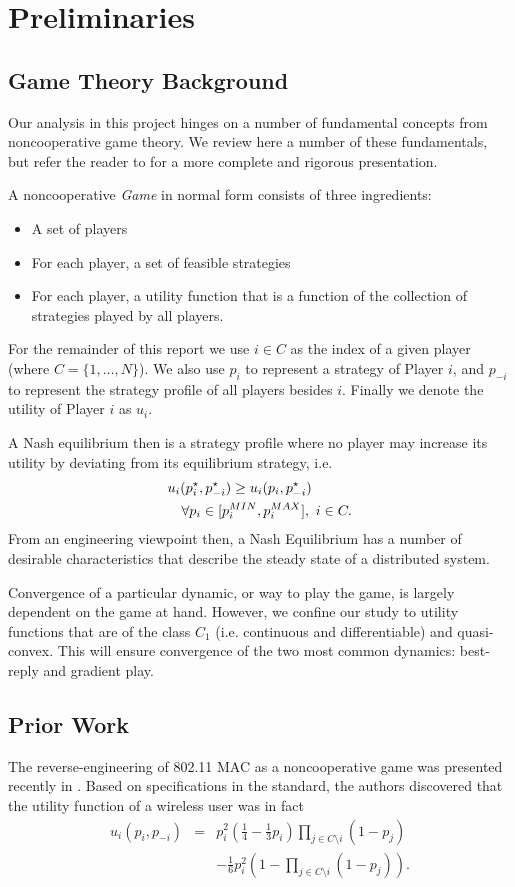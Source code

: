 \documentclass[conference]{IEEEtran}
\theoremstyle{definition}
\begin{document}
\section{Preliminaries}
\subsection{Game Theory Background}
Our analysis in this project hinges on a number of fundamental concepts from noncooperative game theory. We review here a number of these fundamentals, but refer the reader to \cite{OsborneRubinstein_book} for a more complete and rigorous presentation. 

A noncooperative {\em Game} in normal form consists of three ingredients:
\begin{itemize}
	\item A set of players
	\item For each player, a set of feasible strategies 
	\item For each player, a utility function that is a function of the collection of strategies played by all players.
\end{itemize}

For the remainder of this report we use $i \in C$ as the index of a given player (where $C = \{1,\ldots,N\}$). We also use $p_i$ to represent a strategy of Player $i$, and $p_{-i}$ to represent the strategy profile of all players besides $i$. Finally we denote the utility of Player $i$ as $u_i$.

A Nash equilibrium then is a strategy profile where no player may increase its utility by deviating from its equilibrium strategy, i.e.
\begin{eqnarray}
	\lefteqn{u_i(p_i^\star,p_{-i}^\star) \geq u_i(p_i,p_{-i}^\star)}\nonumber \\
	& & \forall p_i\in[p_i^{MIN},p_i^{MAX}], \ i \in C.
\end{eqnarray}
From an engineering viewpoint then, a Nash Equilibrium has a number of desirable characteristics that describe the steady state of a distributed system.

Convergence of a particular dynamic, or way to play the game, is largely dependent on the game at hand. However, we confine our study to utility functions that are of the class $C_1$ (i.e. continuous and differentiable) and quasi-convex. This will ensure convergence of the two most common dynamics: best-reply and gradient play.

\subsection{Prior Work}
The reverse-engineering of 802.11 MAC as a noncooperative game was presented recently in \cite{LTHCC07}. Based on specifications in the standard, the authors discovered that the utility function of a wireless user was in fact
\begin{eqnarray}
	u_i(p_i,p_{-i}) &=& p_i^2\left(\frac{1}{4} - \frac{1}{3}p_i\right)\prod_{j \in C\setminus i}(1-p_j)\nonumber \\
	& & -\frac{1}{6}p_i^2\left(1 - \prod_{j \in C\setminus i}(1-p_j)\right).
	\label{eq:rem}
\end{eqnarray}
\end{document}
